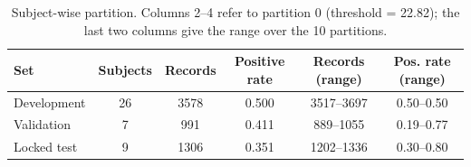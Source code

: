 \begin{table}[!t]\centering\caption{Subject-wise partition. Columns 2--4 refer to partition 0 (threshold = 22.82); the last two columns give the range over the 10 partitions.}\label{tab:data}\scriptsize\setlength{\tabcolsep}{3pt}\begin{tabular}{lccccc}\toprule Set & Subjects & Records & Positive rate & Records (range) & Pos. rate (range)\\\midrule
Development & 26 & 3578 & 0.500 & 3517--3697 & 0.50--0.50\\
Validation & 7 & 991 & 0.411 & 889--1055 & 0.19--0.77\\
Locked test & 9 & 1306 & 0.351 & 1202--1336 & 0.30--0.80\\
\bottomrule\end{tabular}\end{table}
